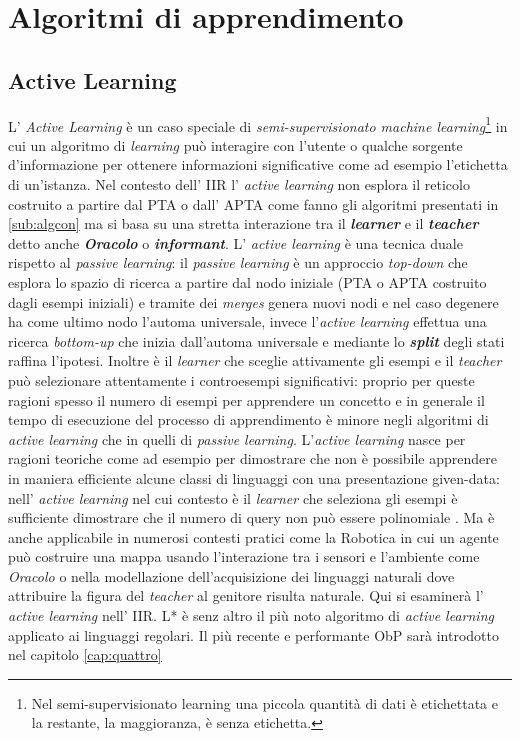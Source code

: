 
\chapter[Algoritmi d'apprendimento]{Algoritmi di apprendimento} %
\label{cap:tre}
\section{Active Learning}
L' \textit{Active Learning} è un caso speciale di \textit{semi-supervisionato machine learning}\footnote{Nel semi-supervisionato learning una piccola quantità di dati è etichettata e la restante, la maggioranza, è senza etichetta.} in cui un algoritmo di \textit{learning} può interagire con l'utente o  qualche sorgente d'informazione per ottenere informazioni significative come ad esempio l'etichetta di un'istanza. Nel contesto dell' \ac{IIR} l' \textit{active learning} non esplora il reticolo costruito a partire dal PTA o dall' APTA come fanno gli algoritmi presentati in \ref{sub:algcon}  ma si basa su una stretta interazione tra il \textit{\textbf{learner}} e il \textit{\textbf{teacher}}  detto anche \textit{\textbf{Oracolo}} o \textit{\textbf{informant}}. L' \textit{active learning} è una tecnica duale rispetto al \textit{passive learning}: il \textit{passive learning} è un approccio \textit{top-down} che esplora lo spazio di ricerca a partire dal nodo iniziale (PTA o APTA costruito  dagli esempi iniziali) e tramite dei \textit{merges} genera nuovi nodi e nel caso degenere ha come ultimo nodo l'automa universale, invece l'\textit{active learning} effettua una ricerca \textit{bottom-up} che inizia dall'automa universale e mediante lo \textbf{\textit{split}} degli stati raffina l'ipotesi. Inoltre è il \textit{learner} che sceglie attivamente gli esempi e  il \textit{teacher} può selezionare attentamente i controesempi significativi: proprio per queste ragioni spesso il numero di esempi per apprendere un concetto e in generale il tempo di esecuzione del processo di apprendimento è minore negli algoritmi di \textit{active learning} che in quelli di \textit{passive learning}.   
L'\textit{active learning} nasce per ragioni teoriche come ad esempio per dimostrare che non è possibile apprendere in maniera efficiente alcune classi di linguaggi con una presentazione given-data: nell' \textit{active learning} nel cui contesto è il \textit{learner} che seleziona gli esempi  è sufficiente dimostrare che il numero di query non può essere polinomiale . Ma è anche applicabile in numerosi contesti pratici come la Robotica in cui un agente può costruire una mappa usando l'interazione tra i sensori e l'ambiente come \textit{Oracolo} o nella modellazione dell'acquisizione dei linguaggi naturali dove attribuire la figura del \textit{teacher} al genitore risulta naturale. Qui si esaminerà l' \textit{active learning} nell' \ac{IIR}. L* è senz altro il più noto algoritmo  di \textit{active learning} applicato ai linguaggi regolari. Il più recente e performante \ac{ObP} sarà introdotto nel capitolo \ref{cap:quattro}
